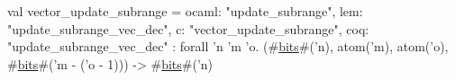 val vector_update_subrange = {
  ocaml: "update_subrange",
  lem: "update_subrange_vec_dec",
  c: "vector_update_subrange",
  coq: "update_subrange_vec_dec"
} : forall 'n 'm 'o. (#\hyperref[zbits]{bits}#('n), atom('m), atom('o), #\hyperref[zbits]{bits}#('m - ('o - 1))) -> #\hyperref[zbits]{bits}#('n)
